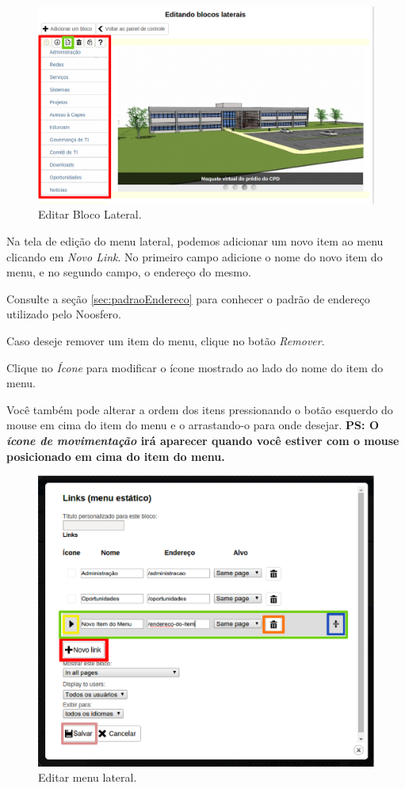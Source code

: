 \begin{figure}[h]
     \centering
       \includegraphics[keepaspectratio=true,scale=0.4]{figuras/editarBlocoLateral.eps}
     \caption{Editar Bloco Lateral.}
     \label{fig:editarBloco}
\end{figure}

\newpage
Na tela de edição do menu lateral, podemos adicionar um novo item ao menu clicando em \emph{\color{red}Novo Link}. No primeiro campo adicione o nome do novo item do menu, e no segundo campo, o endereço do mesmo.

Consulte a seção \ref{sec:padraoEndereco} para conhecer o padrão de endereço utilizado pelo Noosfero.

Caso deseje remover um item do menu, clique no botão \emph{\color{orange}Remover}.

Clique no \emph{\color{yellow}Ícone} para modificar o ícone mostrado ao lado do nome do item do menu.

Você também pode alterar a ordem dos itens pressionando o botão esquerdo do mouse em cima do item do menu e o arrastando-o para onde desejar. 
\textbf{PS: O \emph{\color{blue}ícone de movimentação} irá aparecer quando você estiver com o mouse posicionado em cima do item do menu.}

\begin{figure}[h]
     \centering
       \includegraphics[keepaspectratio=true,scale=0.4]{figuras/editarMenuLateral.eps}
     \caption{Editar menu lateral.}
     \label{fig:editarMenuLateral}
\end{figure}
